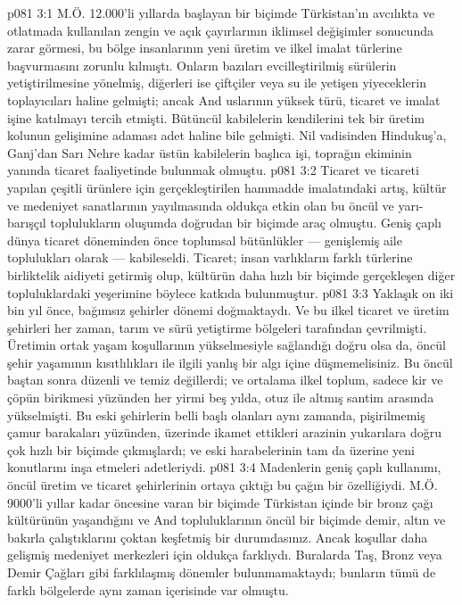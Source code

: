 \vs p081 3:1 M.Ö. 12.000’li yıllarda başlayan bir biçimde Türkistan’ın avcılıkta ve otlatmada kullanılan zengin ve açık çayırlarının iklimsel değişimler sonucunda zarar görmesi, bu bölge insanlarının yeni üretim ve ilkel imalat türlerine başvurmasını zorunlu kılmıştı. Onların bazıları evcilleştirilmiş sürülerin yetiştirilmesine yönelmiş, diğerleri ise çiftçiler veya su ile yetişen yiyeceklerin toplayıcıları haline gelmişti; ancak And uslarının yüksek türü, ticaret ve imalat işine katılmayı tercih etmişti. Bütüncül kabilelerin kendilerini tek bir üretim kolunun gelişimine adaması adet haline bile gelmişti. Nil vadisinden Hindukuş’a, Ganj’dan Sarı Nehre kadar üstün kabilelerin başlıca işi, toprağın ekiminin yanında ticaret faaliyetinde bulunmak olmuştu.
\vs p081 3:2 Ticaret ve ticareti yapılan çeşitli ürünlere için gerçekleştirilen hammadde imalatındaki artış, kültür ve medeniyet sanatlarının yayılmasında oldukça etkin olan bu öncül ve yarı\hyp{}barışçıl toplulukların oluşumda doğrudan bir biçimde araç olmuştu. Geniş çaplı dünya ticaret döneminden önce toplumsal bütünlükler --- genişlemiş aile toplulukları olarak --- kabileseldi. Ticaret; insan varlıkların farklı türlerine birliktelik aidiyeti getirmiş olup, kültürün daha hızlı bir biçimde gerçekleşen diğer topluluklardaki yeşerimine böylece katkıda bulunmuştur.
\vs p081 3:3 Yaklaşık on iki bin yıl önce, bağımsız şehirler dönemi doğmaktaydı. Ve bu ilkel ticaret ve üretim şehirleri her zaman, tarım ve sürü yetiştirme bölgeleri tarafından çevrilmişti. Üretimin ortak yaşam koşullarının yükselmesiyle sağlandığı doğru olsa da, öncül şehir yaşamının kısıtlılıkları ile ilgili yanlış bir algı içine düşmemelisiniz. Bu öncül baştan sonra düzenli ve temiz değillerdi; ve ortalama ilkel toplum, sadece kir ve çöpün birikmesi yüzünden her yirmi beş yılda, otuz ile altmış santim arasında yükselmişti. Bu eski şehirlerin belli başlı olanları aynı zamanda, pişirilmemiş çamur barakaları yüzünden, üzerinde ikamet ettikleri arazinin yukarılara doğru çok hızlı bir biçimde çıkmışlardı; ve eski harabelerinin tam da üzerine yeni konutlarını inşa etmeleri adetleriydi.
\vs p081 3:4 Madenlerin geniş çaplı kullanımı, öncül üretim ve ticaret şehirlerinin ortaya çıktığı bu çağın bir özelliğiydi. M.Ö. 9000’li yıllar kadar öncesine varan bir biçimde Türkistan içinde bir bronz çağı kültürünün yaşandığını ve And topluluklarının öncül bir biçimde demir, altın ve bakırla çalıştıklarını çoktan keşfetmiş bir durumdasınız. Ancak koşullar daha gelişmiş medeniyet merkezleri için oldukça farklıydı. Buralarda Taş, Bronz veya Demir Çağları gibi farklılaşmış dönemler bulunmamaktaydı; bunların tümü de farklı bölgelerde aynı zaman içerisinde var olmuştu.
